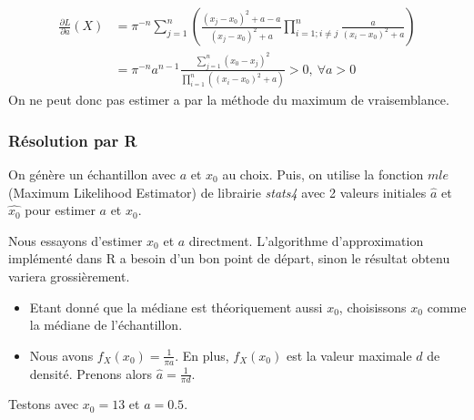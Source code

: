 \documentclass[12pt,a4paper,titlepage]{article}
\numberwithin{equation}{section}
\begin{document}
\begin{align*}
\frac{{\partial L}}{{\partial a}}\left( X \right) & = {\pi ^{ - n}}\sum\limits_{j = 1}^n {\left( {\frac{{{{\left( {{x_j} - {x_0}} \right)}^2} + a - a}}{{{{\left( {{x_j} - {x_0}} \right)}^2} + a}}\prod\limits_{i = 1;i \ne j}^n {\frac{a}{{{{\left( {{x_i} - {x_0}} \right)}^2} + a}}} } \right)}\\
&  = {\pi ^{ - n}}{a^{n - 1}}\frac{{\sum\limits_{j = 1}^n {{{\left( {{x_0} - {x_j}} \right)}^2}} }}{{\prod\limits_{i = 1}^n {\left( {{{\left( {{x_i} - {x_0}} \right)}^2} + a} \right)} }} > 0,\ \forall a > 0
\end{align*}
On ne peut donc pas estimer a par la méthode du maximum de vraisemblance.

\subsubsection*{Résolution par R}

On génère un échantillon avec $a$ et $x_0$ au choix. Puis, on utilise la fonction $mle$ (Maximum Likelihood Estimator) de librairie \emph{stats4} avec 2 valeurs initiales $\hat{a}$ et $\hat{x_0}$ pour estimer $a$ et $x_0$.

Nous essayons d'estimer $x_0$ et $a$ directment. L'algorithme d'approximation implémenté dans R a besoin d'un bon point de départ, sinon le résultat obtenu variera grossièrement.
\begin{itemize}
\item Etant donné que la médiane est théoriquement aussi $x_0$, choisissons $x_0$ comme la médiane de l'échantillon.
\item Nous avons ${f_X}\left( {{x_0}} \right) = \frac{1}{{\pi a}}$. En plus, $f_X(x_0)$ est la valeur maximale $d$ de densité. Prenons alors $\hat a = \frac{1}{{\pi d}}$.
\end{itemize}

Testons avec $x_0=13$ et $a=0.5$.


\end{document}
